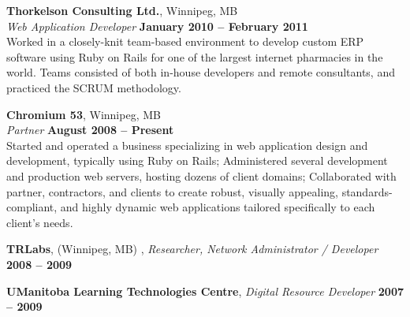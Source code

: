 \documentclass[margin,line,letterpaper]{resume}
\begin{document}
\begin{resume}
  {\bf Thorkelson Consulting Ltd.}, Winnipeg, MB \vspace{2mm}\\\vspace{1mm}%
  {\sl Web Application Developer} \hfill {\bf January 2010 -- February 2011}\\
  Worked in a closely-knit team-based environment to develop custom
  ERP software using Ruby on Rails for one of the largest internet pharmacies in the
  world. Teams consisted of both in-house developers and remote
  consultants, and practiced the SCRUM methodology.

  {\bf Chromium 53}, Winnipeg, MB \vspace{2mm}\\\vspace{1mm}%
  {\sl Partner} \hfill {\bf August 2008 -- Present}\\
  Started and operated a business specializing in web application design and development, 
  typically using Ruby on Rails; Administered several development and production web servers,
  hosting dozens of client domains; Collaborated with partner, contractors, and clients to create
  robust, visually appealing, standards-compliant, and highly dynamic web applications tailored  
  specifically to each client's needs.

  {\bf TRLabs}, (Winnipeg, MB) , {\sl  Researcher, Network Administrator / Developer} \hfill {\bf 2008 -- 2009}


  {\bf UManitoba Learning Technologies Centre}, {\sl Digital Resource Developer} \hfill {\bf 2007 -- 2009}



\end{resume}
\end{document}

